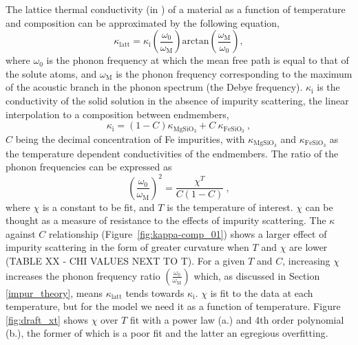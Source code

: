 The lattice thermal conductivity (in \wmk) of a material as a function of temperature and composition can be approximated by the following equation,
%
\begin{equation}
\kappa_{\mathrm{latt}}=\kappa_{\mathrm{i}}\left ( \frac{\omega_{\mathrm{0}}}{\omega_{\mathrm{M}}} \right )\mathrm{arctan}\left ( \frac{\omega_{\mathrm{M}}}{\omega_{\mathrm{0}}} \right ),
\label{eq.ohta7}
\end{equation}
%
where $\omega_{\mathrm{0}}$ is the phonon frequency at which the mean free path is equal to that of the solute atoms, and $\omega_{\mathrm{M}}$ is the phonon frequency corresponding to the maximum of the acoustic branch in the phonon spectrum (the Debye frequency). $\kappa_{\mathrm{i}}$ is the conductivity of the solid solution in the absence of impurity scattering, the linear interpolation to a composition between endmembers,
%
\begin{equation}
\kappa_{\mathrm{i}}=\left ( 1-C \right )\kappa_{\mathrm{MgSiO_{3}}}+C\ \kappa_{\mathrm{FeSiO_{3}}}\ ,
\label{eq.ohta9}
\end{equation}
%
$C$ being the decimal concentration of Fe impurities, with $\kappa_{\mathrm{MgSiO_{3}}}$ and $\kappa_{\mathrm{FeSiO_{3}}}$ as the temperature dependent conductivities of the endmembers. The ratio of the phonon frequencies can be expressed as
%
\begin{equation}
\left ( \frac{\omega_{\mathrm{0}}}{\omega_{\mathrm{M}}} \right )^{2}=\frac{\chi^{T}}{C\left ( 1-C \right )}\ ,
\label{eq.ohta8}
\end{equation}
%
where $\chi$ is a constant to be fit, and $T$ is the temperature of interest. $\chi$ can be thought as a measure of resistance to the effects of impurity scattering. The $\kappa$ against $C$ relationship (Figure~\ref{fig:kappa-comp_01}) shows a larger effect of impurity scattering in the form of greater curvature when $T$ and $\chi$ are lower (TABLE XX - CHI VALUES NEXT TO T). For a given $T$ and $C$, increasing $\chi$ increases the phonon frequency ratio $\left ( \frac{\omega_{\mathrm{0}}}{\omega_{\mathrm{M}}}\right )$ which, as discussed in Section \ref{impur_theory}, means $\kappa_{\mathrm{latt}}$ tends towards $\kappa_{\mathrm{i}}$. $\chi$ is fit to the data at each temperature, but for the model we need it as a function of temperature. Figure \ref{fig:draft_xt} shows $\chi$ over $T$ fit with a power law (a.) and 4th order polynomial (b.), the former of which is a poor fit and the latter an egregious overfitting. 

